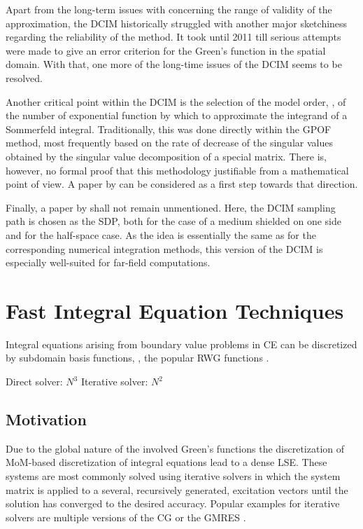 Apart from the long-term issues with concerning the range of validity of the 
approximation, the \ac{DCIM} historically struggled with another major
sketchiness regarding the reliability of the method.
It took until 2011 \cite{Karabulut2011,Karabulut2011b} till serious attempts
were made to give an error criterion for the Green's function in the
spatial domain.
With that, one more of the long-time issues of the \ac{DCIM} seems to be
resolved.

Another critical point within the \ac{DCIM} is the selection of the model order,
\ie, of the number of exponential function by which to approximate the
integrand of a Sommerfeld integral.
Traditionally, this was done directly within the \ac{GPOF} method, most
frequently based on the rate of decrease of the singular values obtained by
the singular value decomposition of a special matrix.
There is, however, no formal proof that this methodology justifiable from a
mathematical point of view.
A paper by \textcite{Karabulut2011a} can be considered as a first step
towards that direction.

Finally, a paper by \textcite{Chen2011} shall not remain unmentioned.
Here, the \ac{DCIM} sampling path is chosen as the \ac{SDP}, both for the case
of a medium shielded on one side and for the half-space case.
As the idea is essentially the same as for the corresponding numerical
integration methods, this version of the \ac{DCIM} is especially well-suited
for far-field computations.







\section{Fast Integral Equation Techniques}

\cite{Harrington1993}

Integral equations arising from boundary value problems in \ac{CE} can be
discretized by subdomain basis functions, \eg, the popular \ac{RWG} functions
\cite{Rao1982}.

Direct solver: $N^3$
Iterative solver: $N^2$

\subsection{Motivation}

Due to the global nature of the involved Green's functions the discretization
of \ac{MoM}-based discretization of integral equations lead to a dense \ac{LSE}.
These systems are most commonly solved using iterative solvers in which the
system matrix is applied to a several, recursively generated, excitation
vectors until the solution has converged to the desired accuracy.
Popular examples for iterative solvers are multiple versions of the \ac{CG}
or the \ac{GMRES} \cite{Strang2010}.

